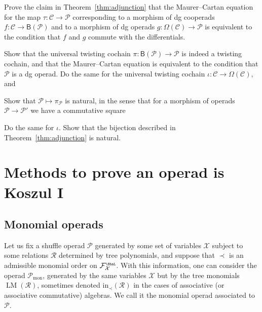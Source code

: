 \documentclass[fleqn, a4paper, twoside]{article}
\makeatletter
\newcommand{\leadm}[1]{\operatorname{LM}(#1)}
\newcommand{\Sha}{{\scaleobj{0.75}{\ShaL}}}
\newcommand{\0}{\langle 0\rangle}
\newcommand{\XX}{\mathcal{X}}
\newcommand{\RR}{\mathcal{R}}
\newcommand{\FF}{\mathcal{F}}
\newcommand{\B}[1]{\mathsf{B}(#1)}
\let\[\@undefined
\DeclareRobustCommand{\[}{\begin{equation}}%
\let\]\@undefined
\DeclareRobustCommand{\]}{\end{equation}}%
\theoremstyle{mytheorem}
\theoremstyle{introthm}
\theoremstyle{mydefinition}
\theoremstyle{mydefinition2}
\theoremstyle{plain} %
\newcommand{\CC}{\mathcal{C}}
\newcommand{\?}{\,?\,}
\newcommand{\PP}{{\mathcal{P}}}
\theoremstyle{mytheorem}
\theoremstyle{plain} %
\newcommand\blankpage{%
    \null
    \thispagestyle{empty}%
    \newpage}
\makeatother
\begin{document}
\begin{question}
Prove the claim in Theorem~\ref{thm:adjunction} that the Maurer--Cartan
equation for the map $\tau : \CC\longrightarrow \PP$ corresponding
to a morphism of dg cooperads $f : \CC\longrightarrow \B{\PP}$
and to a morphism of dg operads $g  :\Omega(\CC) \longrightarrow \PP$
is equivalent to the condition that $f$ and $g$ commute with the
differentials.
\end{question}


\begin{question}\label{ex:universaltw}
Show that the universal twisting cochain
$\pi:\B{\PP}\longrightarrow \PP$ is indeed
a twisting cochain, and that the Maurer--Cartan
equation is equivalent to the condition that 
$\PP$ is a dg operad. Do the same for the 
 universal twisting cochain $\iota : \CC 
\longrightarrow \Omega(\CC)$, and 
\end{question}


\begin{question}
Show that $\PP \longmapsto \pi_\PP$ is natural, in
the sense that for a morphism of operads $\PP\longrightarrow 
\PP'$ we have a commutative square
\[
\]
Do the same for $\iota$. Show that the bijection described in Theorem~\ref{thm:adjunction} 
is natural.  
\end{question}

\afterpage{\blankpage}
\newpage

\section{Methods to prove an operad is Koszul I}\label{lecture:methods1}

 \subsection{Monomial operads}
 
Let us fix a shuffle operad $\PP$ generated by some set of
variables $\XX$ subject to some relations $\RR$ determined
by tree polynomials, and suppose that $\prec$ is an admissible
monomial order on $\FF_\XX^\Sha$. With this information, one
can consider the operad $\PP_\mathrm{mon}$, generated by
the same variables $\XX$ but by the tree monomials 
$\leadm{\RR}$, sometimes denoted $\mathrm{in}_\prec(\RR)$
in the cases of associative (or associative commutative) algebras.
We call it the monomial operad associated to  $\PP$.
\end{document}
